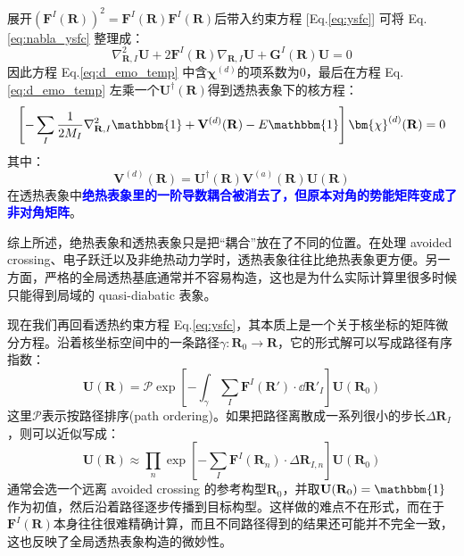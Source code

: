 展开$\left(\mathbf{F}^{I}(\mathbf{R})\right)^2=\mathbf{F}^{I}(\mathbf{R})\mathbf{F}^{I}(\mathbf{R})$后带入约束方程 [Eq.\eqref{eq:ysfc}] 可将 Eq.\eqref{eq:nabla_ysfc} 整理成：
\[\nabla_{\mathbf{R},I}^2\mathbf{U}+2\mathbf{F}^{I}(\mathbf{R})\nabla_{\mathbf{R},I}\mathbf{U}+\mathbf{G}^{I}(\mathbf{R})\mathbf{U}=0\]
因此方程 Eq.\eqref{eq:d_emo_temp} 中含$\bm{\chi}^{(d)}$的项系数为$0$，最后在方程 Eq.\eqref{eq:d_emo_temp} 左乘一个$\mathbf{U}^{\dagger}(\mathbf{R})$得到透热表象下的核方程：
\[\left[-\sum_I\frac{1}{2M_I}\nabla_{\mathbf{R},I}^2\mathbbm{1}+\mathbf{V}^{(d)}(\mathbf{R})-E\mathbbm{1}\right]\bm{\chi}^{(d)}(\mathbf{R})=0\]
其中：
\begin{equation}\label{eq:potential_transform}
\mathbf{V}^{(d)}(\mathbf{R})=\mathbf{U}^{\dagger}(\mathbf{R})\mathbf{V}^{(a)}(\mathbf{R})\mathbf{U}(\mathbf{R})
\end{equation}
在透热表象中\textcolor{blue}{\textbf{绝热表象里的一阶导数耦合被消去了，但原本对角的势能矩阵变成了非对角矩阵}}。

综上所述，绝热表象和透热表象只是把“耦合”放在了不同的位置。在处理 avoided crossing、电子跃迁以及非绝热动力学时，透热表象往往比绝热表象更方便。另一方面，严格的全局透热基底通常并不容易构造，这也是为什么实际计算里很多时候只能得到局域的 quasi-diabatic 表象。

现在我们再回看透热约束方程 Eq.\eqref{eq:ysfc}，其本质上是一个关于核坐标的矩阵微分方程。沿着核坐标空间中的一条路径$\gamma:\mathbf{R}_0\to\mathbf{R}$，它的形式解可以写成路径有序指数：
\[\mathbf{U}(\mathbf{R})=\mathcal{P}\exp\left[-\int_{\gamma}\sum_I\mathbf{F}^{I}(\mathbf{R}')\cdot\dd{\mathbf{R}'_I}\right]\mathbf{U}(\mathbf{R}_0)\]
这里$\mathcal{P}$表示按路径排序(path ordering)。如果把路径离散成一系列很小的步长$\Delta \mathbf{R}_I$，则可以近似写成：
\[\mathbf{U}(\mathbf{R})\approx\prod_n\exp\left[-\sum_I\mathbf{F}^{I}(\mathbf{R}_n)\cdot\Delta \mathbf{R}_{I,n}\right]\mathbf{U}(\mathbf{R}_0)\]
通常会选一个远离 avoided crossing 的参考构型$\mathbf{R}_0$，并取$\mathbf{U}(\mathbf{R}_0)=\mathbbm{1}$作为初值，然后沿着路径逐步传播到目标构型。这样做的难点不在形式，而在于$\mathbf{F}^{I}(\mathbf{R})$本身往往很难精确计算，而且不同路径得到的结果还可能并不完全一致，这也反映了全局透热表象构造的微妙性。

\newpage
